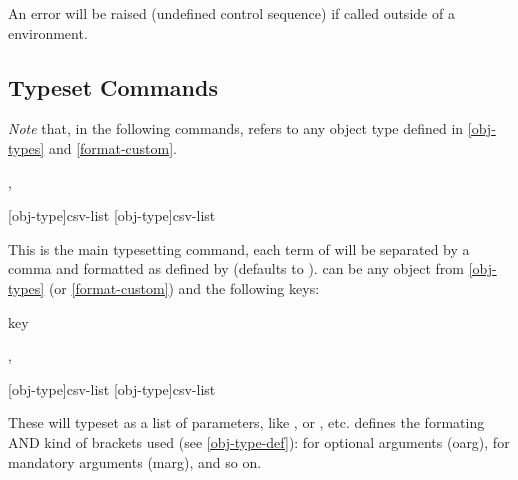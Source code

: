 \documentclass{article}
\begin{document}
\begin{tsremark}
An error will be raised (undefined control sequence) if called outside of a  environment.
\end{tsremark}


\subsection{Typeset Commands}\label{ts-commands}
\emph{Note} that, in the following commands,  refers to any object type defined in  \ref{obj-types} and \ref{format-custom}.

\begin{codedescribe}[code,update=2025/05/29]{\typesetobj,\tsobj}
\begin{codesyntax}
\tsmacro{\typesetobj}[obj-type]{csv-list}
\tsmacro{\tsobj}[obj-type]{csv-list}
\end{codesyntax}
This is the main typesetting command, each term of  will be separated by a comma and formatted as defined by  (defaults to ).  can be any object from \ref{obj-types} (or \ref{format-custom}) and the following keys:
\begin{describelist*}{key}
\end{describelist*}
\end{codedescribe}


\begin{codedescribe}[code]{\typesetargs,\tsargs}
\begin{codesyntax}
\tsmacro{\typesetargs}[obj-type]{csv-list}
\tsmacro{\tsargs}[obj-type]{csv-list}
\end{codesyntax}
 These will typeset  as a list of parameters, like , or , etc.  defines the formating AND kind of brackets used (see \ref{obj-type-def}): \tsverb{[]} for optional arguments (oarg), \tsverb{{}} for mandatory arguments (marg), and so on.
\end{codedescribe}
\end{document}
